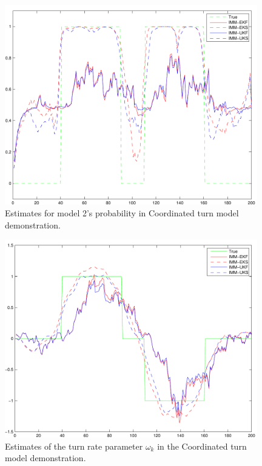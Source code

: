\begin{figure}
\begin{center}
\includegraphics[width=11cm]{pics/eimm1_2}
\caption{ Estimates for model 2's probability in Coordinated turn
model demonstration.  }
\label{fig:eimm1_2}
\end{center}
\end{figure}

\begin{figure}
\begin{center}
\includegraphics[width=11cm]{pics/eimm1_3}
\caption{ Estimates of the turn rate parameter $\omega_k$ in the
Coordinated turn model demonstration.  }
\label{fig:eimm1_3}
\end{center}
\end{figure}

